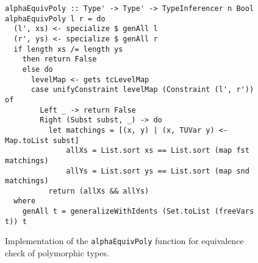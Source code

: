 \begin{figure}[H]
  \begin{verbatim}
alphaEquivPoly :: Type' -> Type' -> TypeInferencer n Bool
alphaEquivPoly l r = do
  (l', xs) <- specialize $ genAll l
  (r', ys) <- specialize $ genAll r
  if length xs /= length ys
    then return False
    else do
      levelMap <- gets tcLevelMap
      case unifyConstraint levelMap (Constraint (l', r')) of
        Left _ -> return False
        Right (Subst subst, _) -> do
          let matchings = [(x, y) | (x, TUVar y) <- Map.toList subst]
              allXs = List.sort xs == List.sort (map fst matchings)
              allYs = List.sort ys == List.sort (map snd matchings)
          return (allXs && allYs)
  where
    genAll t = generalizeWithIdents (Set.toList (freeVars t)) t
  \end{verbatim}
  \caption{Implementation of the \texttt{alphaEquivPoly} function for equivalence check of polymorphic types.}
  \label{fig:alpha-equiv-polytypes}
\end{figure}

